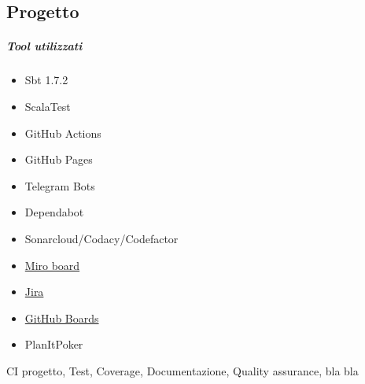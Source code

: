     \subsection{Progetto}
        \subparagraph{Tool utilizzati}
        \begin{itemize}
            \item Sbt 1.7.2
            \item ScalaTest
            \item GitHub Actions
            \item GitHub Pages
            \item Telegram Bots
            \item Dependabot
            \item Sonarcloud/Codacy/Codefactor
            \item \href{https://miro.com/app/board/uXjVPN93uLs=/?share_link_id=56431555728}{Miro board}
            \item  \href{https://riccardo-omiccioli.atlassian.net/jira/software/projects/IQ/boards/1/roadmap}{Jira}
            \item  \href{https://github.com/orgs/ISIQuiz/projects/3}{GitHub Boards}
            \item  PlanItPoker \cite{planitpoker}
        \end{itemize}
    CI progetto, Test, Coverage, Documentazione, Quality assurance, bla bla
        







